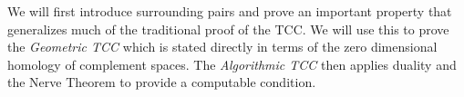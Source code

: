 %

We will first introduce surrounding pairs and prove an important property that generalizes much of the traditional proof of the TCC.
We will use this to prove the \emph{Geometric TCC} which is stated directly in terms of the zero dimensional homology of complement spaces.
The \emph{Algorithmic TCC} then applies duality and the Nerve Theorem to provide a computable condition.
